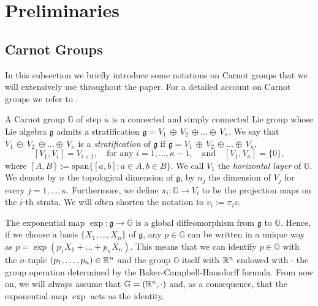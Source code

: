 \documentclass[10pt, a4paper,
oneside, headinclude,footinclude]{scrartcl}
\begin{document}
\section{Preliminaries}\label{sec:Prel}
\subsection{Carnot Groups}\label{sub:Carnot}
In this subsection we briefly introduce some notations on Carnot groups that we will extensively use throughout the paper. For a detailed account on Carnot groups we refer to \cite{LD17}.


A Carnot group $\mathbb{G}$ of step $\kappa$  is a connected and simply connected Lie group whose Lie algebra $\mathfrak g$ admits a stratification $\mathfrak g=V_1\, \oplus \, V_2 \, \oplus \dots \oplus \, V_\kappa$. We say that $V_1\, \oplus \, V_2 \, \oplus \dots \oplus \, V_\kappa$ is a {\em stratification} of $\mathfrak g$ if $\mathfrak g = V_1\, \oplus \, V_2 \, \oplus \dots \oplus \, V_\kappa$,
$$
[V_1,V_i]=V_{i+1}, \quad \text{for any $i=1,\dots,\kappa-1$}, \quad \text{and} \quad [V_1,V_\kappa]=\{0\},
$$ 
where $[A,B]:=\mathrm{span}\{[a,b]:a\in A,b\in B\}$. We call $V_1$ the \emph{horizontal layer} of $\mathbb G$. We denote by $n$ the topological dimension of $\mathfrak g$, by $n_j$ the dimension of $V_j$ for every $j=1,\dots,\kappa$. %
Furthermore, we define $\pi_i:\mathbb{G}\to V_i$ to be the projection maps on the $i$-th strata. %
We will often shorten the notation to $v_i:=\pi_iv$.

The exponential map $\exp :\mathfrak g \to \mathbb{G}$ is a global diffeomorphism from $\mathfrak g$ to $\mathbb{G}$.
Hence, if we choose a basis $\{X_1,\dots , X_n\}$ of $\mathfrak g$,  any $p\in \mathbb{G}$ can be written in a unique way as $p=\exp (p_1X_1+\dots +p_nX_n)$. This means that we can identify $p\in \mathbb{G}$ with the $n$-tuple $(p_1,\dots , p_n)\in \mathbb{R}^n$ and the group $\mathbb{G}$ itself with $\mathbb{R}^n$ endowed with $\cdot$ the group operation determined by the Baker-Campbell-Hausdorff formula. From now on, we will always assume that $\mathbb{G}=(\mathbb{R}^n,\cdot)$ and, as a consequence, that the exponential map $\exp$ acts as the identity.
\end{document}
